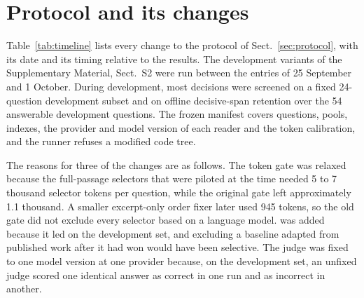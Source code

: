 \section{Protocol and its changes}
\label{app:timeline}
Table~\ref{tab:timeline} lists every change to the protocol of Sect.~\ref{sec:protocol}, with its date and its timing relative to the results.
The development variants of the Supplementary Material, Sect.~S2 were run between the entries of 25 September and 1 October.
During development, most decisions were screened on a fixed 24-question development subset and on offline decisive-span retention over the 54 answerable development questions.
The frozen manifest covers questions, pools, indexes, the provider and model version of each reader and the token calibration, and the runner refuses a modified code tree.


The reasons for three of the changes are as follows.
The token gate was relaxed because the full-passage selectors that were piloted at the time needed 5 to 7 thousand selector tokens per question, while the original gate left approximately 1.1 thousand.
A smaller excerpt-only order fixer later used 945 tokens, so the old gate did not exclude every selector based on a language model.
\setr{} was added because it led on the development set, and excluding a baseline adapted from published work after it had won would have been selective.
The judge was fixed to one model version at one provider because, on the development set, an unfixed judge scored one identical answer as correct in one run and as incorrect in another.


